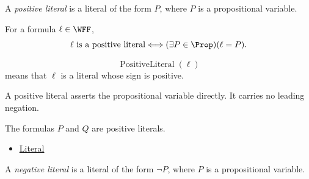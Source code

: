 \begin{tcolorbox}[colback=propbox, colframe=propborder, arc=2pt,
  left=6pt, right=6pt, top=4pt, bottom=4pt,
  title={\small\textbf{Definition (Positive Literal)}},
  fonttitle=\small\bfseries]
\begin{definition}
\label{def:positive-literal-propositional-logic}
A \emph{positive literal} is a literal of the form \(P\), where \(P\) is a
propositional variable.
\end{definition}
\end{tcolorbox}

\begin{remark*}
For a formula \(\ell\in\WFF\),
\[
\ell\text{ is a positive literal}
\Longleftrightarrow
(\exists P\in\Prop)(\ell=P).
\]
\end{remark*}

\begin{remark*}
\[
\operatorname{PositiveLiteral}(\ell)
\]
means that \(\ell\) is a literal whose sign is positive.
\end{remark*}

\begin{remark*}[Interpretation]
A positive literal asserts the propositional variable directly. It carries no
leading negation.
\end{remark*}

\begin{remark*}[Examples]
The formulas \(P\) and \(Q\) are positive literals.
\end{remark*}

\begin{dependencies}
\begin{itemize}
  \item \hyperref[def:literal-propositional-logic]{Literal}
\end{itemize}
\end{dependencies}

\begin{tcolorbox}[colback=propbox, colframe=propborder, arc=2pt,
  left=6pt, right=6pt, top=4pt, bottom=4pt,
  title={\small\textbf{Definition (Negative Literal)}},
  fonttitle=\small\bfseries]
\begin{definition}
\label{def:negative-literal-propositional-logic}
A \emph{negative literal} is a literal of the form \(\neg P\), where \(P\) is a
propositional variable.
\end{definition}
\end{tcolorbox}

